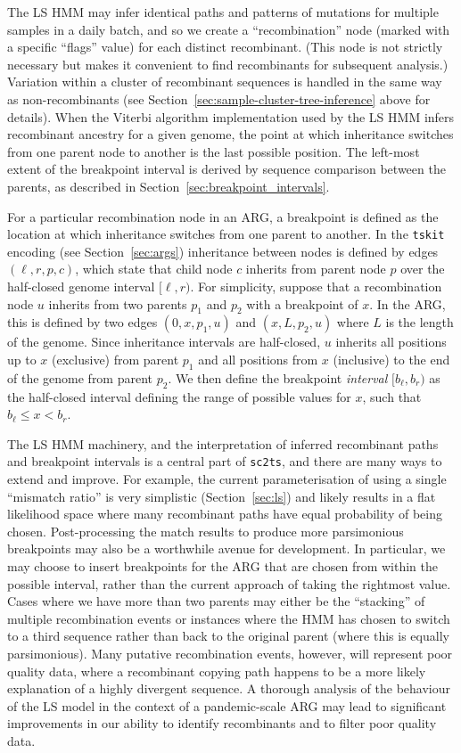 \documentclass{article}
\begin{document}
The LS HMM may infer identical paths and patterns of mutations
for multiple samples in a daily batch, and so we
create a ``recombination'' node (marked with a specific ``flags'' value)
for each distinct recombinant. (This node is not strictly necessary
but makes it convenient to find recombinants for subsequent analysis.)
Variation within a cluster
of recombinant sequences is handled in the same way as non-recombinants
(see Section~\ref{sec:sample-cluster-tree-inference} above for details).
When the Viterbi algorithm implementation used by the LS HMM infers
recombinant ancestry for a given genome, the point at which inheritance
switches from one parent node to another is the last possible
position. The left-most extent of the breakpoint interval is derived
by sequence comparison between the parents, as described in
Section~\ref{sec:breakpoint_intervals}.

For a particular recombination node in an ARG, a  breakpoint
is defined as the location at which inheritance switches from one parent
to another.
In the \texttt{tskit} encoding (see Section~\ref{sec:args}) inheritance between
nodes is defined by edges $(\ell, r, p, c)$, which state that child node $c$
inherits from parent node $p$
over the half-closed genome interval $[\ell, r)$.
For simplicity, suppose that a recombination node $u$ inherits from two
parents $p_1$ and $p_2$ with a breakpoint of $x$.
In the ARG, this is defined by two edges
$(0, x, p_1, u)$ and $(x, L, p_2, u)$ where $L$ is the length of the genome.
Since inheritance intervals are half-closed,
$u$ inherits all positions up to $x$ (exclusive) from parent $p_1$
and all positions from $x$ (inclusive) to the end of the genome from parent
$p_2$. We then define the breakpoint \emph{interval} $[b_\ell, b_r)$ as the
half-closed interval defining the range of possible values for $x$, such
that $b_\ell \leq x < b_r$.

The LS HMM machinery, and the interpretation of inferred recombinant paths and
breakpoint intervals is a central part of \texttt{sc2ts}, and there are many
ways to extend and improve. For example, the current parameterisation of using
a single ``mismatch ratio'' is very simplistic (Section~\ref{sec:ls}) and likely
results in a flat likelihood space where many recombinant paths have equal
probability of being chosen.
Post-processing the match results to produce
more parsimonious breakpoints may also be a worthwhile avenue for development.
In particular, we may choose to insert breakpoints for the ARG that are chosen
from within the possible interval, rather than the current approach of taking
the rightmost value. Cases where we have more than two parents may either be
the ``stacking'' of multiple recombination events or instances where
the HMM has chosen to switch to a third sequence rather than back to
the original parent (where this is equally parsimonious). Many putative
recombination events, however, will represent poor quality data, where
a recombinant copying path happens to be a more likely explanation
of a highly divergent sequence.
A thorough analysis of the behaviour of the LS model in the context
of a pandemic-scale ARG may lead to significant improvements in our
ability to identify recombinants and to filter poor quality data.
\end{document}
